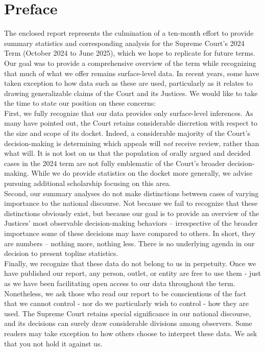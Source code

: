 \newpage
\section{Preface}

\large
\noindent The enclosed report represents the culmination of a ten-month effort to provide summary statistics and corresponding analysis for the Supreme Court's 2024 Term (October 2024 to June 2025), which we hope to replicate for future terms. \\

\noindent Our goal was to provide a comprehensive overview of the term while recognizing that much of what we offer remains surface-level data. In recent years, some have taken exception to how data such as these are used, particularly as it relates to drawing generalizable claims of the Court and its Justices. We would like to take the time to state our position on these concerns: \\

\noindent First, we fully recognize that our data provides only surface-level inferences. As many have pointed out, the Court retains considerable discretion with respect to the size and scope of its docket. Indeed, a considerable majority of the Court's decision-making is determining which appeals will \emph{not} receive review, rather than what will. It is not lost on us that the population of orally argued and decided cases in the 2024 term are not fully emblematic of the Court's broader decision-making. While we do provide statistics on the docket more generally, we advise pursuing additional scholarship focusing on this area.\\

\noindent Second, our summary analyses do not make distinctions between cases of varying importance to the national discourse. Not because we fail to recognize that these distinctions obviously exist, but because our goal is to provide an overview of the Justices' most observable decision-making behaviors -- irrespective of the broader importance some of these decisions may have compared to others. In short, they are numbers -- nothing more, nothing less. There is no underlying agenda in our decision to present topline statistics. \\

\noindent Finally, we recognize that these data do not belong to us in perpetuity. Once we have published our report, any person, outlet, or entity are free to use them - just as we have been facilitating open access to our data throughout the term. Nonetheless, we ask those who read our report to be conscientious of the fact that we cannot control - nor do we particularly wish to control - how they are used. The Supreme Court retains special significance in our national discourse, and its decisions can surely draw considerable divisions among observers. Some readers may take exception to how others choose to interpret these data. We ask that you not hold it against us. \\

